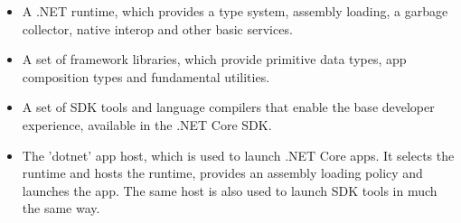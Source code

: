 \documentclass[../thesis.tex]{subfiles}
\begin{document}
\begin{itemize}
\item A .NET runtime, which provides a type system, assembly loading, a garbage collector, native interop and other basic services.
\vspace{5mm}
\item A set of framework libraries, which provide primitive data types, app composition types and fundamental utilities.
\vspace{5mm}
\item A set of SDK tools and language compilers that enable the base developer experience, available in the .NET Core SDK.
\vspace{5mm}
\item The 'dotnet' app host, which is used to launch .NET Core apps. It selects the runtime and hosts the runtime, provides an assembly loading policy and launches the app. The same host is also used to launch SDK tools in much the same way.
\end{itemize}
\end{document}
